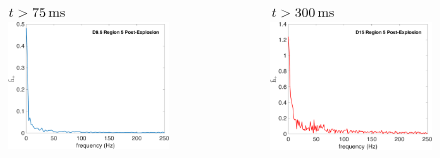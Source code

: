 \documentclass[aspectratio=169]{beamer}
\begin{document}
\begin{frame}

  \begin{columns}[c]

    \begin{figure}
      $t>75\,\mathrm{ms}$
      \includegraphics[width=1.0\textwidth]{Figures/D9.6_PostE.pdf}
    \end{figure}

    \begin{figure}
      $t>300\,\mathrm{ms}$
      \includegraphics[width=1.0\textwidth]{Figures/D15_PostE.pdf}
    \end{figure}


\end{columns}
\end{frame}
\end{document}
